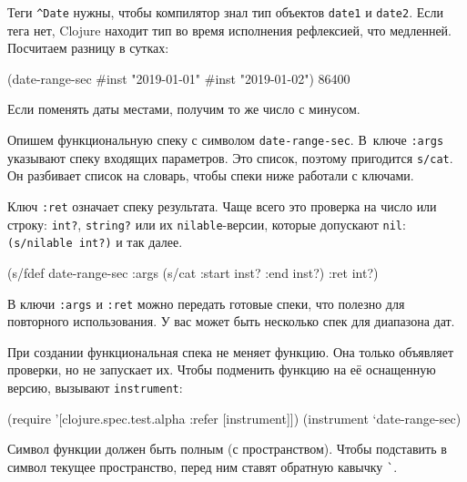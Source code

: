 Теги \verb|^Date| нужны, чтобы компилятор знал тип объектов \verb|date1| и
\verb|date2|. Если тега нет, Clojure находит тип во время исполнения
рефлексией, что медленней. Посчитаем разницу в сутках:

\begin{english}
  \begin{clojure}
(date-range-sec #inst "2019-01-01" #inst "2019-01-02")
86400
  \end{clojure}
\end{english}

\noindent
Если поменять даты местами, получим то же число с минусом.

Опишем функциональную спеку с символом \verb|date-range-sec|. В~ключе
\verb|:args| указывают спеку входящих параметров. Это список, поэтому пригодится
\verb|s/cat|. Он разбивает список на словарь, чтобы спеки ниже работали с
ключами.

Ключ \verb|:ret| означает спеку результата. Чаще всего это проверка на число или
строку: \verb|int?|, \verb|string?| или их \verb|nilable|-версии, которые
допускают \verb|nil|: \verb|(s/nilable int?)| и так далее.


\begin{english}
  \begin{clojure}
(s/fdef date-range-sec
  :args (s/cat :start inst? :end inst?)
  :ret int?)
  \end{clojure}
\end{english}

В ключи \verb|:args| и \verb|:ret| можно передать готовые спеки, что полезно
для повторного использования. У вас может быть несколько спек для диапазона дат.

При создании функциональная спека не меняет функцию. Она только объявляет
проверки, но не запускает их. Чтобы подменить функцию на её оснащенную версию,
вызывают \verb|instrument|:

\begin{english}
  \begin{clojure}
(require '[clojure.spec.test.alpha :refer [instrument]])
(instrument `date-range-sec)
  \end{clojure}
\end{english}


Символ функции должен быть полным (с пространством). Чтобы подставить в символ
текущее пространство, перед ним ставят обратную кавычку \verb|`|.

